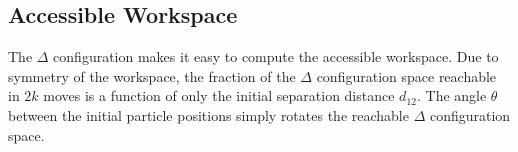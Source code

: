 %



\subsection{Accessible Workspace}

The $\Delta$ configuration makes it easy to compute the accessible workspace.  
 Due to symmetry of the workspace, the fraction of the $\Delta$ configuration space reachable in $2 k$ moves is a function of only the initial separation distance $d_{12}$.
 The angle $\theta$ between the initial particle positions simply rotates the reachable $\Delta$ configuration space.

